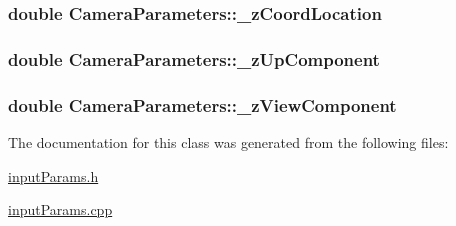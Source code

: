 \hypertarget{classCameraParameters_aed6d05074103cf30bcf3f31815a065ef}{
\subsubsection[{\-\_\-z\-Coord\-Location}]{\setlength{\rightskip}{0pt plus 5cm}double Camera\-Parameters\-::\-\_\-z\-Coord\-Location\hspace{0.3cm}{\ttfamily [private]}}}\label{classCameraParameters_aed6d05074103cf30bcf3f31815a065ef}
\hypertarget{classCameraParameters_abb271f19440d69874ca9723639dfe96a}{
\subsubsection[{\-\_\-z\-Up\-Component}]{\setlength{\rightskip}{0pt plus 5cm}double Camera\-Parameters\-::\-\_\-z\-Up\-Component\hspace{0.3cm}{\ttfamily [private]}}}\label{classCameraParameters_abb271f19440d69874ca9723639dfe96a}
\hypertarget{classCameraParameters_ab6f0394f3b83592bdfea515271cf6dcb}{
\subsubsection[{\-\_\-z\-View\-Component}]{\setlength{\rightskip}{0pt plus 5cm}double Camera\-Parameters\-::\-\_\-z\-View\-Component\hspace{0.3cm}{\ttfamily [private]}}}\label{classCameraParameters_ab6f0394f3b83592bdfea515271cf6dcb}


The documentation for this class was generated from the following files\-:\begin{DoxyCompactItemize}
\item 
\hyperlink{inputParams_8h}{input\-Params.\-h}\item 
\hyperlink{inputParams_8cpp}{input\-Params.\-cpp}\end{DoxyCompactItemize}
